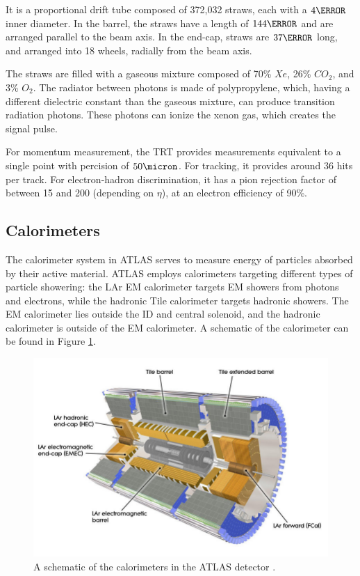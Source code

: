 It is a proportional drift tube composed of 372,032 straws, each with a $\unit{4}{\mm}$ inner diameter. In the barrel, the straws have a length of $\unit{144}{\cm}$ and are arranged parallel to the beam axis. In the end-cap, straws are $\unit{37}{\cm}$ long, and arranged into 18 wheels, radially from the beam axis.

The straws are filled with a gaseous mixture composed of 70\% $Xe$, 26\% $CO_2$, and 3\% $O_2$. The radiator between photons is made of polypropylene, which, having a different dielectric constant than the gaseous mixture, can produce transition radiation photons. These photons can ionize the xenon gas, which creates the signal pulse.


For momentum measurement, the \gls{TRT} provides measurements equivalent to a single point with percision of $\unit{50}{\micron}$. For tracking, it provides around 36 hits per track. For electron-hadron discrimination, it has a pion rejection factor of between 15 and 200 (depending on $\eta$), at an electron efficiency of 90\%.

    

\subsection{Calorimeters} \label{ssec:calorimeters}
The calorimeter system in ATLAS serves to measure energy of particles absorbed by their active material. ATLAS employs calorimeters targeting different types of particle showering: the \gls{LAr} \gls{EM} calorimeter targets \gls{EM} showers from photons and electrons, while the hadronic Tile calorimeter targets hadronic showers. The \gls{EM} calorimeter lies outside the \gls{ID} and central solenoid, and the hadronic calorimeter is outside of the \gls{EM} calorimeter.  A schematic of the calorimeter can be found in Figure \ref{fig:calorimeter}.


\begin{figure}[!ht]
    \centering
    \includegraphics[width=.7\textwidth]{chapters/chapter2_experiment/images/calorimeter.jpeg}
    \caption{A schematic of the calorimeters in the ATLAS detector \cite{atlas-experiment}.}
    \label{fig:calorimeter}
\end{figure}

